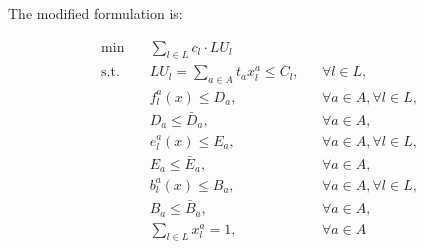 	The modified formulation is:
	\begin{center}
		\begin{align}
			\min & \quad \sum_{l \in L} c_l \cdot LU_l  \tag{1}
			\label{eq:objective}
			\\
			\text{s.t.} 
			& \quad LU_l = \sum_{a \in A} t_a x^a_l \leq C_l, 
			&& \forall l \in L, \tag{2} \label{eq:2} \\			
			& \quad f^a_l(x) \leq D_a, 
			&& \forall a \in A, \forall l \in L, \tag{3} \label{eq:3} \\	
			& \quad D_a \leq \bar{D}_a, 
			&& \forall a \in A, \tag{4} \label{eq:4} \\	
			& \quad e^a_l(x) \leq E_a, 
			&& \forall a \in A, \forall l \in L, \tag{5}  \label{eq:5} \\	
			& \quad E_a \leq \bar{E}_a, 
			&& \forall a \in A, \tag{6}  \label{eq:6} \\	
			& \quad b^a_l(x) \leq B_a, 
			&& \forall a \in A, \forall l \in L, \tag{7}  \label{eq:7} \\	
			& \quad B_a \leq \bar{B}_a, 
			&& \forall a \in A, \tag{8}  \label{eq:8} \\	
			& \quad \sum_{l \in L} x^a_l = 1, 
			&& \forall a \in A \tag{9}  \label{eq:9}
		\end{align}
	\end{center}
	
